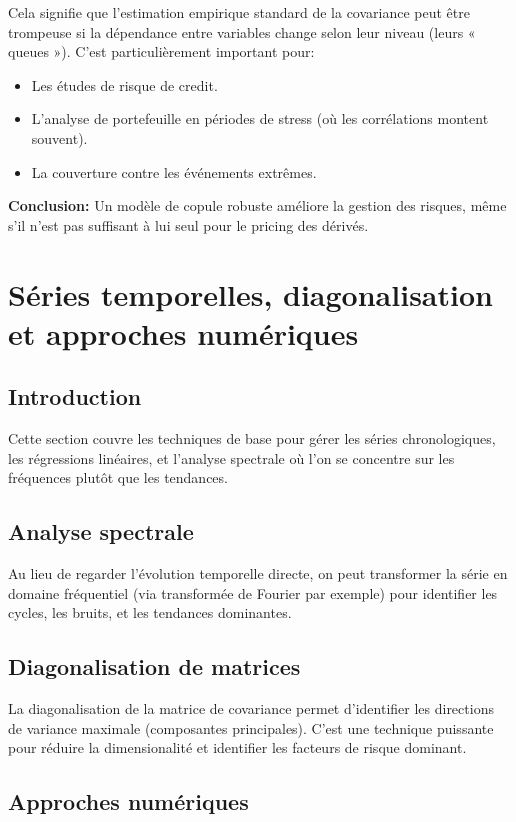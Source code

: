 \documentclass[11pt,a4paper]{article}
\begin{document}
Cela signifie que l'estimation empirique standard de la covariance peut être trompeuse si la dépendance entre variables change selon leur niveau (leurs « queues »). C'est particulièrement important pour:
\begin{itemize}
\item Les études de risque de credit.
\item L'analyse de portefeuille en périodes de stress (où les corrélations montent souvent).
\item La couverture contre les événements extrêmes.
\end{itemize}

\textbf{Conclusion:} Un modèle de copule robuste améliore la gestion des risques, même s'il n'est pas suffisant à lui seul pour le pricing des dérivés.

\section{Séries temporelles, diagonalisation et approches numériques}

\subsection{Introduction}

Cette section couvre les techniques de base pour gérer les séries chronologiques, les régressions linéaires, et l'analyse spectrale où l'on se concentre sur les fréquences plutôt que les tendances.

\subsection{Analyse spectrale}

Au lieu de regarder l'évolution temporelle directe, on peut transformer la série en domaine fréquentiel (via transformée de Fourier par exemple) pour identifier les cycles, les bruits, et les tendances dominantes.

\subsection{Diagonalisation de matrices}

La diagonalisation de la matrice de covariance permet d'identifier les directions de variance maximale (composantes principales). C'est une technique puissante pour réduire la dimensionalité et identifier les facteurs de risque dominant.

\subsection{Approches numériques}
\end{document}
